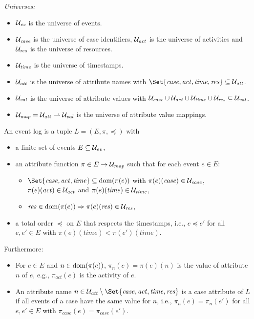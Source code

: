 \medskip
\noindent\emph{Universes:}
\begin{itemize}[beginpenalty=10000]
	\item $\mathcal{U}_{\mathit{ev}}$ is the universe of events.
	\item $\mathcal{U}_{\mathit{case}}$ is the universe of case identifiers, $\mathcal{U}_{\mathit{act}}$ is the universe of activities and $\mathcal{U}_{\mathit{res}}$ is the universe of resources.
	\item $\mathcal{U}_{\mathit{time}}$ is the universe of timestamps.
	\item $\mathcal{U}_{\mathit{att}}$ is the universe of attribute names with $\Set{\mathit{case}, \mathit{act}, \mathit{time}, \mathit{res}} \subseteq \U{att}$.
	\item $\mathcal{U}_{\mathit{val}}$ is the universe of attribute values with $\mathcal{U}_{\mathit{case}} \cup \mathcal{U}_{\mathit{act}} \cup \mathcal{U}_{\mathit{time}} \cup \mathcal{U}_{\mathit{res}} \subseteq \mathcal{U}_{\mathit{val}}$.
	\item $\mathcal{U}_{\mathit{map}} = \mathcal{U}_{\mathit{att}} \rightharpoonup \mathcal{U}_{\mathit{val}}$ is the universe of attribute value mappings.
\end{itemize}

\begin{definition}
	\label{def:prelim:event_log}
	An event log is a tuple $L = (E, \pi, \preceq)$ with
	\begin{itemize}
		\item a finite set of events $E \subseteq \mathcal{U}_{\mathit{ev}}$,
		\item an attribute function $\pi \in E \to \mathcal{U}_{\mathit{map}}$ such that for each event $e \in E$:
		      \begin{itemize}
			      \item $\Set{\mathit{case}, \mathit{act}, \mathit{time}} \subseteq \dom(\pi(e))$ with $\pi(e)(\mathit{case}) \in \mathcal{U}_{\mathit{case}}$, $\pi(e)(\mathit{act}) \in \mathcal{U}_{\mathit{act}}$ and $\pi(e)(\mathit{time}) \in \mathcal{U}_{\mathit{time}}$,
			      \item $\mathit{res} \in \operatorname*{dom}(\pi(e)) \Rightarrow \pi(e)(\mathit{res}) \in \mathcal{U}_{\mathit{res}}$,
		      \end{itemize}
		\item a total order $\preceq$ on $E$ that respects the timestamps, i.e., $e \preceq e'$ for all $e, e' \in E$ with $\pi(e)(\mathit{time}) < \pi(e')(\mathit{time})$.
	\end{itemize}
	Furthermore:
	\begin{itemize}
		\item For $e \in E$ and $n \in \operatorname*{dom}(\pi(e))$, $\pi_n(e) = \pi(e)(n)$ is the value of attribute $n$ of $e$, e.g., $\pi_{\mathit{act}}(e)$ is the activity of $e$.
		\item An attribute name $n \in \U{att} \setminus \Set{\mathit{case}, \mathit{act}, \mathit{time}, \mathit{res}}$ is a case attribute of $L$ if all events of a case have the same value for $n$, i.e., $\pi_n(e) = \pi_n(e')$ for all $e, e' \in E$ with $\pi_{\mathit{case}}(e) = \pi_{\mathit{case}}(e')$.
	\end{itemize}
\end{definition}

